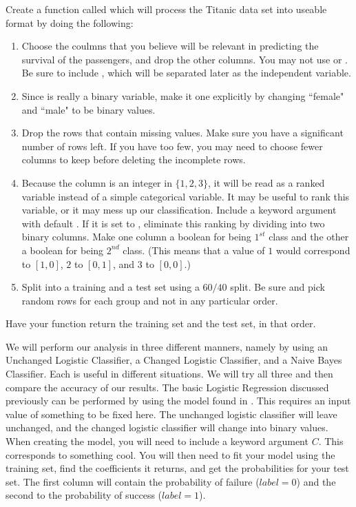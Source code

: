 \begin{problem}
Create a function called  which will process the Titanic data set into useable format by doing the following:
\begin{enumerate}
\item Choose the coulmns that you believe will be relevant in predicting the survival of the passengers, and drop the other columns.  You may not use  or .  Be sure to include , which will be separated later as the independent variable.
\item Since  is really a binary variable, make it one explicitly by changing ``female" and ``male" to be binary values.
\item Drop the rows that contain missing values.  Make sure you have a significant number of rows left.  If you have too few, you may need to choose fewer columns to keep before deleting the incomplete rows.
\item Because the  column is an integer in $\{1, 2, 3\}$, it will be read as a ranked variable instead of a simple categorical variable.  It may be useful to rank this variable, or it may mess up our classification.  Include a keyword argument  with default .  If it is set to , eliminate this ranking by dividing  into two binary columns.  Make one column a boolean for being $1^{st}$ class and the other a boolean for being $2^{nd}$ class. (This means that a value of $1$ would correspond to $[1, 0]$, $2$ to $[0, 1]$, and $3$ to $[0, 0]$.)
\item Split into a training and a test set using a $60/40$ split.  Be sure and pick random rows for each group and not in any particular order.
\end{enumerate}
Have your function return the training set and the test set, in that order.
\end{problem}

We will perform our analysis in three different manners, namely by using an Unchanged Logistic Classifier, a Changed Logistic Classifier, and a Naive Bayes Classifier.  Each is useful in different situations.  We will try all three and then compare the accuracy of our results.
The basic Logistic Regression discussed previously can be performed by using the  model found in .  This requires an input value of something to be fixed here.  The unchanged logistic classifier will leave  unchanged, and the changed logistic classifier will change  into binary values.  When creating the model, you will need to include a keyword argument $C$.  This corresponds to something cool.  You will then need to fit your model using the training set, find the coefficients it returns, and get the probabilities for your test set.  The first column will contain the probability of failure ($label = 0$) and the second to the probability of success ($label = 1$).

